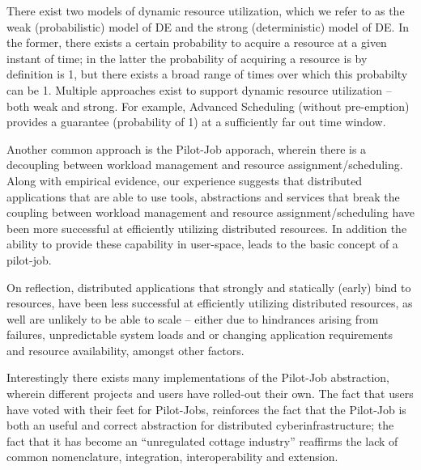 \documentclass[conference,final]{IEEEtran}
\newcommand{\jhanote}[1]{ {\textcolor{red} { ***shantenu: #1 }}}
\newcommand{\jhanote}[1]{}
\begin{document}
There exist two models of dynamic resource utilization, which we refer
to as the weak (probabilistic) model of DE and the strong
(deterministic) model of DE. In the former, there exists a certain
probability to acquire a resource at a given instant of time; in the
latter the probability of acquiring a resource is by definition is 1,
but there exists a broad range of times over which this probabilty can
be 1.  Multiple approaches exist to support dynamic resource
utilization -- both weak and strong.  For example, Advanced Scheduling
(without pre-emption) provides a guarantee (probability of 1) at a
sufficiently far out time window. 

Another common approach is the Pilot-Job apporach, wherein there is a
decoupling between workload management and resource
assignment/scheduling.  Along with empirical evidence, our experience
suggests that distributed applications that are able to use tools,
abstractions and services that break the coupling between workload
management and resource assignment/scheduling have been more
successful at efficiently utilizing distributed resources.  In
addition the ability to provide these capability in user-space, leads
to the basic concept of a pilot-job.



On reflection, distributed applications that strongly and statically
(early) bind to resources, have been less successful at efficiently
utilizing distributed resources, as well are unlikely to be able to
scale -- either due to hindrances arising from failures, unpredictable
system loads and or changing application requirements and resource
availability, amongst other factors.




Interestingly there exists many implementations of the Pilot-Job
abstraction, wherein different projects and users have rolled-out
their own. The fact that users have voted with their feet for
Pilot-Jobs, reinforces the fact that the Pilot-Job is both an useful
and correct abstraction for distributed cyberinfrastructure; the fact
that it has become an ``unregulated cottage industry'' reaffirms the
lack of common nomenclature, integration, interoperability and
extension.
\end{document}
